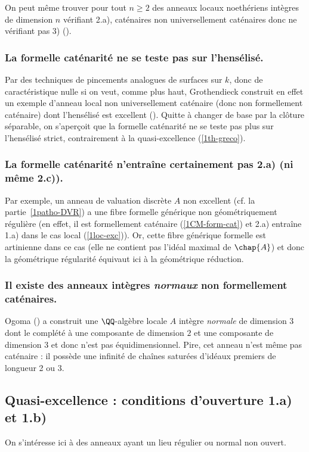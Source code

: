 \documentclass[10pt]{../fichiers-configuration-latex/smfart}
\begin{document}
On peut même trouver pour tout $n\geq 2$ des anneaux locaux noethériens intègres de dimension $n$
vérifiant 2.a), caténaires non universellement caténaires donc ne vérifiant pas 3)
(\cite{Hei-Rot-Wie00}).

\subsubsection{La formelle caténarité ne se teste pas sur l'hensélisé.} Par des techniques de
pincements analogues de surfaces sur $k$, donc de caractéristique nulle si on veut, comme plus haut,
Grothendieck construit en effet un exemple d'anneau local non universellement caténaire (donc non
formellement caténaire) dont l'hensélisé  est excellent (). Quitte à changer de
base par la clôture séparable, on s'aperçoit que la formelle caténarité ne se teste pas plus sur
l'hensélisé strict, contrairement à la quasi-excellence (\ref{1th-greco}).

\subsubsection{La formelle caténarité n'entraîne certainement pas 2.a) (ni même 2.c)).} Par exemple,
un anneau de valuation discrète $A$ non excellent (cf. la partie~\ref{1patho-DVR}) a une fibre
formelle générique non géométriquement régulière (en effet, il est formellement caténaire
(\ref{1CM-form-cat}) et 2.a) entraîne 1.a) dans le cas local (\ref{1loc-exc})). Or, cette fibre
générique formelle est artinienne dans ce cas (elle ne contient pas l'idéal maximal de $\chap{A}$)
et donc la géométrique régularité équivaut ici à la géométrique réduction.


\subsubsection{Il existe des anneaux intègres \emph{normaux} non formellement caténaires.} Ogoma
(\cite{Ogo81}) a construit une $\QQ$-algèbre locale $A$ intègre \emph{normale} de dimension $3$ dont
le complété à une composante de dimension $2$ et une composante de dimension $3$ et donc n'est pas
équidimensionnel. Pire, cet anneau n'est même pas caténaire : il possède une infinité de chaînes
saturées d'idéaux premiers de longueur 2 ou 3.



\subsection{Quasi-excellence : conditions d'ouverture  1.a) et 1.b)}\label{1ex-non-1} On s'intéresse
ici à des anneaux ayant un lieu régulier ou normal non ouvert.
\end{document}
